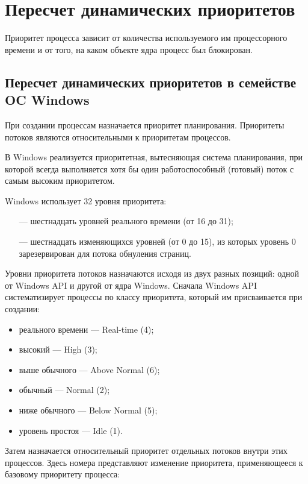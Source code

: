 \chapter{Пересчет динамических приоритетов}

Приоритет процесса зависит от количества используемого им процессорного времени и от того, на каком объекте ядра процесс был блокирован.

\section{Пересчет динамических приоритетов в семействе OC Windows}

При создании процессам назначается приоритет планирования. Приоритеты потоков являются относительными к приоритетам процессов.

В Windows реализуется приоритетная, вытесняющая система планирования, при которой всегда выполняется хотя бы один работоспособный (готовый) поток с самым высоким приоритетом.

Windows использует 32 уровня приоритета:
\begin{itemize}
	\item[---] шестнадцать уровней реального времени (от 16 до 31);
	\item[---] шестнадцать изменяющихся уровней (от 0 до 15), из которых уровень 0 зарезервирован для потока обнуления страниц.
\end{itemize}

Уровни приоритета потоков назначаются исходя из двух разных позиций:
одной от Windows API и другой от ядра Windows. 
Сначала Windows API систематизирует процессы по классу приоритета, который им присваивается при создании:

\begin{itemize}[label*=--]
	\item реального времени --- Real-time (4);
	\item высокий --- High (3);
	\item выше обычного --- Above Normal (6);
	\item обычный --- Normal (2);
	\item ниже обычного --- Below Normal (5);
	\item уровень простоя --- Idle (1).
\end{itemize}

Затем назначается относительный приоритет отдельных потоков внутри этих процессов. 
Здесь номера представляют изменение приоритета, применяющееся к базовому приоритету процесса:

